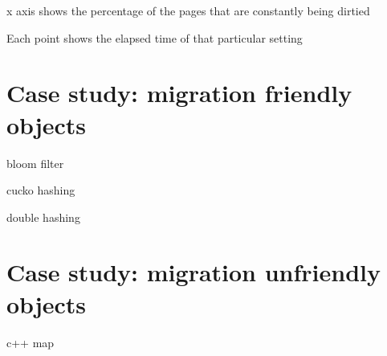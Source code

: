 x axis shows the percentage of the pages that are constantly being dirtied

Each point shows the elapsed time of that particular setting


\section{Case study: migration friendly objects}

bloom filter

cucko hashing

double hashing

\section{Case study: migration unfriendly objects}

c++ map



